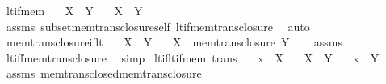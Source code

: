 \begin{isabellebody}
\isanewline
{}\isamarkupfalse%
\ lt{\isacharunderscore}{\kern0pt}if{\isacharunderscore}{\kern0pt}mem{\isacharcolon}{\kern0pt}\isanewline
\ \ \ {\isachardoublequoteopen}X\ {\isasymin}\ Y{\isachardoublequoteclose}\isanewline
\ \ \ {\isachardoublequoteopen}X\ {\isacharless}{\kern0pt}\ Y{\isachardoublequoteclose}\isanewline
%
\isadelimproof
\ \ %
\endisadelimproof
%
\isatagproof
{}\isamarkupfalse%
\ assms\ subset{\isacharunderscore}{\kern0pt}mem{\isacharunderscore}{\kern0pt}trans{\isacharunderscore}{\kern0pt}closure{\isacharunderscore}{\kern0pt}self\ lt{\isacharunderscore}{\kern0pt}if{\isacharunderscore}{\kern0pt}mem{\isacharunderscore}{\kern0pt}trans{\isacharunderscore}{\kern0pt}closure\ \isamarkupfalse%
\ auto%
\endisatagproof
{\isafoldproof}%
%
\isadelimproof
\isanewline
%
\endisadelimproof
\isanewline
{}\isamarkupfalse%
\ mem{\isacharunderscore}{\kern0pt}trans{\isacharunderscore}{\kern0pt}closure{\isacharunderscore}{\kern0pt}if{\isacharunderscore}{\kern0pt}lt{\isacharcolon}{\kern0pt}\isanewline
\ \ \ {\isachardoublequoteopen}X\ {\isacharless}{\kern0pt}\ Y{\isachardoublequoteclose}\isanewline
\ \ \ {\isachardoublequoteopen}X\ {\isasymin}\ mem{\isacharunderscore}{\kern0pt}trans{\isacharunderscore}{\kern0pt}closure\ Y{\isachardoublequoteclose}\isanewline
%
\isadelimproof
\ \ %
\endisadelimproof
%
\isatagproof
{}\isamarkupfalse%
\ assms\ \isamarkupfalse%
\ lt{\isacharunderscore}{\kern0pt}iff{\isacharunderscore}{\kern0pt}mem{\isacharunderscore}{\kern0pt}trans{\isacharunderscore}{\kern0pt}closure\ \isamarkupfalse%
\ simp%
\endisatagproof
{\isafoldproof}%
%
\isadelimproof
\isanewline
%
\endisadelimproof
\isanewline
{}\isamarkupfalse%
\ lt{\isacharunderscore}{\kern0pt}if{\isacharunderscore}{\kern0pt}lt{\isacharunderscore}{\kern0pt}if{\isacharunderscore}{\kern0pt}mem\ {\isacharbrackleft}{\kern0pt}trans{\isacharbrackright}{\kern0pt}{\isacharcolon}{\kern0pt}\isanewline
\ \ \ {\isachardoublequoteopen}x\ {\isasymin}\ X{\isachardoublequoteclose}\isanewline
\ \ \ {\isachardoublequoteopen}X\ {\isacharless}{\kern0pt}\ Y{\isachardoublequoteclose}\isanewline
\ \ \ {\isachardoublequoteopen}x\ {\isacharless}{\kern0pt}\ Y{\isachardoublequoteclose}\isanewline
%
\isadelimproof
\ \ %
\endisadelimproof
%
\isatagproof
{}\isamarkupfalse%
\ assms\ mem{\isacharunderscore}{\kern0pt}trans{\isacharunderscore}{\kern0pt}closed{\isacharunderscore}{\kern0pt}mem{\isacharunderscore}{\kern0pt}trans{\isacharunderscore}{\kern0pt}closure\ \isamarkupfalse%

\end{isabellebody}
